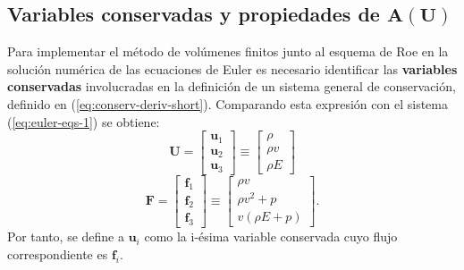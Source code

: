 \subsection{Variables conservadas y propiedades de $\mathbf{A(\mathbf{U})}$}
Para implementar el método de volúmenes finitos junto al esquema de Roe en la solución numérica de las ecuaciones de Euler es necesario identificar las \textbf{variables conservadas} involucradas en la definición de un sistema general de conservación, definido en (\ref{eq:conserv-deriv-short}). Comparando esta expresión con el sistema (\ref{eq:euler-eqs-1}) se obtiene:
\begin{equation}
	\mathbf{U} = 
	\begin{bmatrix}
		\mathbf{u}_1 \\
		\mathbf{u}_2 \\
		\mathbf{u}_3
	\end{bmatrix} \equiv
	\begin{bmatrix}
		\rho \\
		\rho v \\
		\rho E
	\end{bmatrix}
\end{equation}
\begin{equation}
	\mathbf{F} = 
	\begin{bmatrix}
		\mathbf{f}_1 \\
		\mathbf{f}_2 \\
		\mathbf{f}_3
	\end{bmatrix} \equiv
	\begin{bmatrix}
		\rho v \\
		\rho v^2 + p \\
		v(\rho E + p)
	\end{bmatrix}.
\label{eq:flujo-euler-exacto}
\end{equation}
Por tanto, se define a $\mathbf{u}_i$ como la i-ésima variable conservada cuyo  flujo correspondiente es $\mathbf{f}_i$. 

